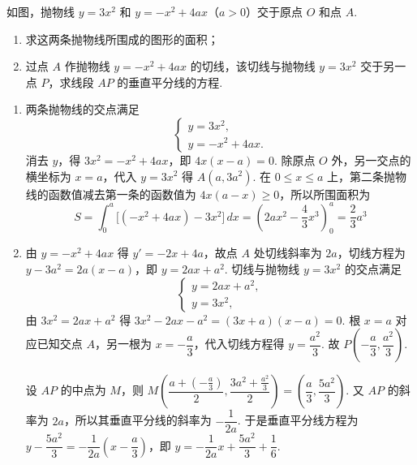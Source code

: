 \begin{problem}
如图，抛物线 \(y = 3x^{2}\) 和 \(y = -x^{2} + 4ax\)（\(a > 0\)）交于原点 \(O\) 和点 \(A\).

\begin{enumerate}
\item 求这两条抛物线所围成的图形的面积；
\item 过点 \(A\) 作抛物线 \(y = -x^{2} + 4ax\) 的切线，该切线与抛物线 \(y = 3x^{2}\) 交于另一点 \(P\)，求线段 \(AP\) 的垂直平分线的方程.
\end{enumerate}

\end{problem}

\begin{solution}
\begin{enumerate}
\item 两条抛物线的交点满足
\[
\begin{cases}
y = 3x^2,\\
y = -x^2 + 4ax.
\end{cases}
\]
消去 \(y\)，得 \(3x^2=-x^2+4ax\)，即 \(4x(x-a)=0\). 除原点 \(O\) 外，另一交点的横坐标为 \(x=a\)，代入 \(y=3x^2\) 得 \(A(a,3a^2)\). 在 \(0\leq x\leq a\) 上，第二条抛物线的函数值减去第一条的函数值为 \(4x(a-x)\geq0\)，所以所围面积为
\[
S=\int_0^a\bigl[(-x^2+4ax)-3x^2\bigr]\,dx=\left(2ax^2-\frac43x^3\right)_0^a=\frac23a^3
\]

\item 由 \(y = -x^2 + 4ax\) 得 \(y' = -2x + 4a\)，故点 \(A\) 处切线斜率为 \(2a\)，切线方程为 \(y - 3a^2 = 2a(x - a)\)，即 \(y = 2ax + a^2\).
切线与抛物线 \(y=3x^2\) 的交点满足
\[
\begin{cases}
y = 2ax + a^2,\\
y = 3x^2,
\end{cases}
\]
由 \(3x^2=2ax+a^2\) 得 \(3x^2-2ax-a^2=(3x+a)(x-a)=0\). 根 \(x=a\) 对应已知交点 \(A\)，另一根为 \(x=-\dfrac{a}{3}\)，代入切线方程得 \(y=\dfrac{a^2}{3}\). 故 \(P\left(-\dfrac{a}{3},\dfrac{a^2}{3}\right)\).

设 \(AP\) 的中点为 \(M\)，则
\(M\left(\dfrac{a+(-\frac{a}{3})}2,\dfrac{3a^2+\frac{a^2}{3}}2\right)=\left(\dfrac a3,\dfrac{5a^2}{3}\right)\). 又 \(AP\) 的斜率为 \(2a\)，所以其垂直平分线的斜率为 \(-\dfrac1{2a}\). 于是垂直平分线方程为
\(y-\dfrac{5a^2}{3}=-\dfrac1{2a}\left(x-\dfrac a3\right)\)，即 \(y=-\dfrac1{2a}x+\dfrac{5a^2}{3}+\dfrac16\).
\end{enumerate}
\end{solution}

